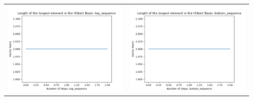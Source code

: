 \documentclass[10pt]{article}
\begin{document}
\begin{tabular}{c|c}
\begin{minipage}{.45\textwidth}
\includegraphics[width=\textwidth]{"DATA/5d/5 generators 1 bound E/top_sequence LENGTH"}
\end{minipage} &
\begin{minipage}{.45\textwidth}
\includegraphics[width=\textwidth]{"DATA/5d/5 generators 1 bound E bottomup/bottom_sequence LENGTH"}
\end{minipage}
\end{tabular}
\end{document}
